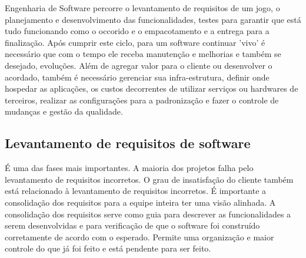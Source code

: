 Engenharia de Software percorre o levantamento de requisitos de um jogo, o planejamento e desenvolvimento das funcionalidades, testes para garantir que está tudo funcionando como o occorido e o empacotamento e a entrega para a finalização. Após cumprir este ciclo, para um software continuar 'vivo' é necessário que com o tempo ele receba manutenção e melhorias e também se desejado, evoluções. Além de agregar valor para o cliente ou desenvolver o acordado, também é necessário gerenciar sua infra-estrutura, definir onde hospedar as aplicações, os custos decorrentes de utilizar serviços ou hardwares de terceiros, realizar as configurações para a padronização e fazer o controle de mudanças e gestão da qualidade.

\subsection[Levantamento de requisitos de software]{Levantamento de requisitos de software}
É uma das fases mais importantes. A maioria dos projetos falha pelo levantamento de requisitos incorretos. O grau de insatisfação do cliente também está relacionado à levantamento de requisitos incorretos. É importante a consolidação dos requisitos para a equipe inteira ter uma visão alinhada. A consolidação dos requisitos serve como guia para descrever as funcionalidades a serem desenvolvidas e para verificação de que o software foi construído corretamente de acordo com o esperado. Permite uma organização e maior controle do que já foi feito e está pendente para ser feito. 

